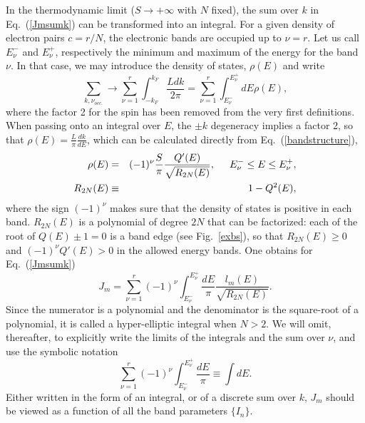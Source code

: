 \documentclass[]{revtex4-1}
\begin{document}
In the thermodynamic limit ($S \rightarrow +\infty$ with $N$ fixed), the sum over $k$ in Eq.~(\ref{Jmsumk}) can be transformed into an integral. For a given density of electron pairs $c=r/N$, the electronic bands are occupied up to $\nu=r$.
Let us call $E_{\nu}^-$ and $E_{\nu}^+$, respectively the minimum and maximum of the energy for the band $\nu$. In that case, we may introduce the density of states, $\rho(E)$ and write 
\begin{equation}
\sum_{k,\nu_{occ.}} \rightarrow \sum_{\nu=1}^r \int_{-k_F}^{k_F} \frac{Ldk}{2\pi} = \sum_{\nu=1}^r \int_{E_{\nu}^-}^{E_{\nu}^+} dE \rho(E),
\end{equation}
where the factor 2 for the spin has been removed from the very first definitions.  When passing onto an integral over $E$, the $\pm k$ degeneracy implies a factor 2, so that $\rho(E) = \frac{L}{\pi} \frac{dk}{dE}$, which can be calculated directly from Eq.~(\ref{bandstructure}),
\begin{eqnarray}
  \rho(E) &=& (-1)^{\nu} \frac{S}{ \pi} \frac{Q'(E)}{\sqrt{R_{2N}(E)}}, \hspace{.5cm} E_{\nu}^- \leq E \leq E_{\nu}^+,  \\ R_{2N}(E) &\equiv & 1-Q^2(E), \end{eqnarray} where the sign $(-1)^{\nu}$ makes sure that the density of states is positive in each band. $R_{2N}(E)$ is a polynomial of degree $2N$ that can be factorized: each of the root of $Q(E) \pm 1=0$ is a band edge (see Fig.~\ref{exbs}), so that $R_{2N}(E) \geq 0$ and $(-1)^{\nu}Q'(E)>0$ in the allowed energy bands. One obtains for Eq.~(\ref{Jmsumk})
\begin{equation}
J_m =   \sum_{\nu=1}^r (-1)^{\nu} \int_{E_{\nu}^-}^{E_{\nu}^+} \frac{dE}{\pi} \frac{ l_m(E)}{\sqrt{R_{2N}(E)}}. 
\label{integralthermo}
\end{equation}
Since the numerator is a polynomial and the denominator is the square-root of a polynomial, it is called a hyper-elliptic integral when $N>2$. We will omit, thereafter, to explicitly write the limits of the integrals and the sum over $\nu$, and use the symbolic notation
\begin{equation}
 \sum_{\nu=1}^r (-1)^{\nu} \int_{E_{\nu}^-}^{E_{\nu}^+} \frac{dE}{\pi} \equiv \int dE. \label{specialnotation}
\end{equation}
Either written
in the form of an integral, or of a discrete sum over $k$, $J_m$ should be viewed as a function of all the band parameters $\{I_n\}$.
\end{document}
